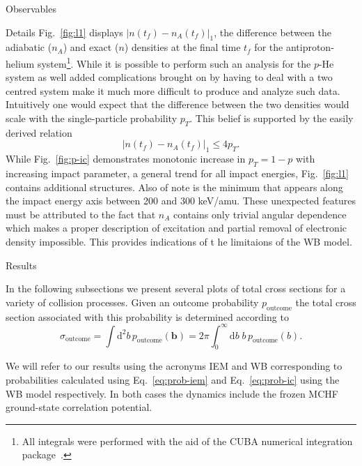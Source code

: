 \documentclass[letterpaper, 11 pt]{report}
\begin{document}
\begin{chapter}{Observables \label{chap:p-he2p-he}}
\begin{section}{Details \label{sec:phe2p-det}}
      Fig.~\ref{fig:l1} displays $\left| n\left(t_f\right) - n_A\left(t_f\right) \right|_1$, the
      difference between the adiabatic ($n_A$) and exact ($n$) densities at the final time $t_f$ for the
      antiproton-helium system\footnote{All integrals were performed with the aid of the CUBA numerical
      integration package~\cite{cuba}.}. While it is possible to perform such an analysis for the $p$-He
      system as well added complications brought on by having to deal with a two centred system make it
      much more difficult to produce and analyze such data. Intuitively one would expect that the
      difference between the two densities would scale with the single-particle probability $p_T$. This
      belief is supported by the easily derived relation 
      \begin{equation} \label{eq:diff-bound}
         \left| n(t_f) - n_A(t_f) \right|_1 \leq 4 p_T.
      \end{equation}
      While Fig.~\ref{fig:p-ic} demonstrates monotonic increase in $p_T = 1 - p$ with increasing impact
      parameter, a general trend for all impact energies, Fig.~\ref{fig:l1} contains additional
      structures. Also of note is the minimum that appears along the impact energy axis between 200 and
      300 keV/amu. These unexpected features must be attributed to the fact that $n_A$ contains only
      trivial angular dependence which makes a proper description of excitation and partial removal of
      electronic density impossible. This provides indications of t he limitaions of the WB model.

   \end{section}

   \begin{section}{Results \label{sec:phe2p-res}}

      In the following subsections we present several plots of total cross sections for a variety of
      collision processes. Given an outcome probability $p_\mathrm{outcome}$ the total cross section
      associated with this probability is determined according to
      \begin{equation} \label{eq:tcs}
         \sigma_\mathrm{outcome} = \int \mathrm{d}^2 b \, p_\mathrm{outcome} (\mathbf{b})
         = 2 \pi \int^\infty_0 \mathrm{d}b \; b \, p_\mathrm{outcome} (b).
      \end{equation}
   
      We will refer to our results using the acronyms IEM and WB corresponding to probabilities
      calculated using Eq.~\eqref{eq:prob-iem} and Eq.~\eqref{eq:prob-ic} using the WB model
      respectively. In both cases the dynamics include the frozen MCHF ground-state correlation
      potential.


\end{section}
\end{chapter}
\end{document}
